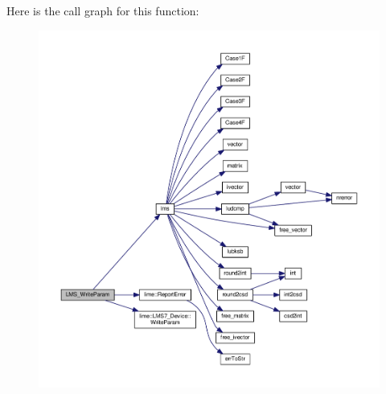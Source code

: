 Here is the call graph for this function\+:
\nopagebreak
\begin{figure}[H]
\begin{center}
\leavevmode
\includegraphics[width=350pt]{df/de1/lms7__api_8cpp_a29da2b25b3336c31d75b70bb4eb32673_cgraph}
\end{center}
\end{figure}




